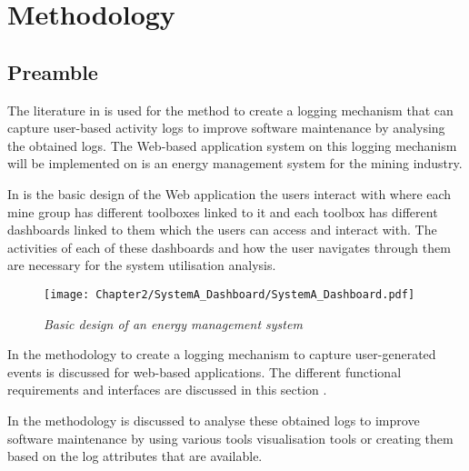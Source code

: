 \chapter{Methodology}
\label{chap:2}

\section{Preamble}\label{sec:ch2_preamble}
 The literature in  is used for the method to create a logging mechanism that can capture user-based activity logs to improve software maintenance by analysing the obtained logs. The Web-based application system on this logging mechanism will be implemented on is an energy management system for the mining industry.\par In  is the basic design of the Web application the users interact with where each mine group has different toolboxes linked to it and each toolbox has different dashboards linked to them which the users can access and interact with. The activities of each of these dashboards and how the user navigates through them are necessary for the system utilisation analysis.

\begin{figure}[!htb] %
	\centering %
	\texttt{[image: Chapter2/SystemA\_Dashboard/SystemA\_Dashboard.pdf]}
	\caption[Basic design of an energy management system]
	{\textit{Basic design of an energy management system}}\label{fig:ch2_webSystemBasic}
\end{figure}

In  the methodology to create a logging mechanism to capture user-generated events is discussed for web-based applications. The different functional requirements and interfaces are discussed in this section \cite{Anish2015}.\par In  the methodology is discussed to analyse these obtained logs to improve software maintenance by using various tools visualisation tools or creating them based on the log attributes that are available.

